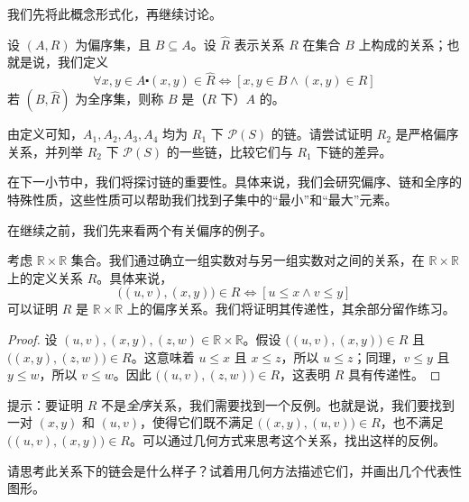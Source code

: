 我们先将此概念形式化，再继续讨论。

\begin{definition}
    设 $(A, R)$ 为偏序集，且 $B \subseteq A$。设 $\hat{R}$ 表示关系 $R$ 在集合 $B$ 上构成的关系；也就是说，我们定义
    \[\forall x, y \in A \centerdot (x, y) \in \hat{R} \iff [x, y \in B \land (x, y) \in R]\]
    若 $(B, \hat{R})$ 为全序集，则称 $B$ 是（$R$ 下）$A$ 的。
\end{definition}

由定义可知，$A_1, A_2, A_3, A_4$ 均为 $R_1$ 下 $\mathcal{P}(S)$ 的链。请尝试证明 $R_2$ 是严格偏序关系，并列举 $R_2$ 下 $\mathcal{P}(S)$ 的一些链，比较它们与 $R_1$ 下链的差异。

在下一小节中，我们将探讨链的重要性。具体来说，我们会研究偏序、链和全序的特殊性质，这些性质可以帮助我们找到子集中的``最小''和``最大''元素。

在继续之前，我们先来看两个有关偏序的例子。

\begin{example}
    考虑 $\mathbb{R} \times \mathbb{R}$ 集合。我们通过确立一组实数对与另一组实数对之间的关系，在 $\mathbb{R} \times \mathbb{R}$ 上的定义关系 $R$。具体来说，
    \[\big((u, v),(x, y)\big) \in R \iff [u \le x \land v \le y]\]
    可以证明 $R$ 是 $\mathbb{R} \times \mathbb{R}$ 上的偏序关系。我们将证明其传递性，其余部分留作练习。
    \begin{proof}
        设 $(u, v),(x, y),(z, w) \in \mathbb{R} \times \mathbb{R}$。假设 $\big((u, v),(x, y)\big) \in R$ 且 $\big((x, y),(z, w)\big) \in R$。这意味着 $u \le x$ 且 $x \le z$，所以 $u \le z$；同理，$v \le y$ 且 $y \le w$，所以 $v \le w$。因此 $\big((u, v),(z, w)\big) \in R$，这表明 $R$ 具有传递性。
    \end{proof}
    提示：要证明 $R$ 不是\emph{全序}关系，我们需要找到一个反例。也就是说，我们要找到一对 $(x, y)$ 和 $(u, v)$，使得它们既不满足 $\big((x, y),(u, v)\big) \in R$，也不满足 $\big((u, v),(x, y)\big) \in R$。可以通过几何方式来思考这个关系，找出这样的反例。

    请思考此关系下的链会是什么样子？试着用几何方法描述它们，并画出几个代表性图形。
\end{example}

